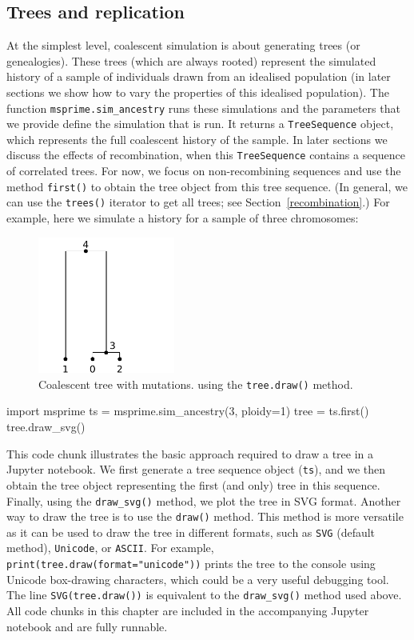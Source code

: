 \documentclass[graybox]{svmult}
\begin{document}
\subsection{Trees and replication}
At the simplest level, coalescent simulation is about generating trees (or genealogies).
These trees (which are always rooted) represent the simulated history of a sample of individuals
drawn from an idealised population (in later sections we show how to
vary the properties of this idealised population). The function
\texttt{msprime.sim\_ancestry} runs these simulations and the parameters
that we provide define the simulation that is
run. It returns a \texttt{TreeSequence} object, which represents the
full coalescent history of the sample. In later sections we discuss the
effects of recombination, when this \texttt{TreeSequence} contains a
sequence of correlated trees. For now, we focus on non-recombining sequences and
use the method \texttt{first()} to obtain the
tree object from this tree sequence. (In general, we can use the \texttt{trees()} iterator
to get all trees; see Section~\ref{recombination}.) For example, here we simulate a
history for a sample of three chromosomes:

\begin{figure}[t]
\begin{center}
\includegraphics[width=0.4\textwidth]{images/plot_1.pdf}
\end{center}
\caption{\label{fig-simple-tree} Coalescent tree with mutations.
using the \texttt{tree.draw()} method.}
\end{figure}

\begin{pythoncode}
import msprime
ts = msprime.sim_ancestry(3, ploidy=1)
tree = ts.first()
tree.draw_svg()
\end{pythoncode}

This code chunk illustrates the basic approach required to draw a tree
in a Jupyter notebook. We first generate a tree sequence object (\texttt{ts}),
and we then obtain the tree object representing the first (and only)
tree in this sequence. Finally, using the \texttt{draw\_svg()} method, we plot
the tree in SVG format. Another way to draw the tree is to use the
\texttt{draw()} method. This method is more versatile as it can be used to
draw the tree in different formats, such as \texttt{SVG} (default method),
\texttt{Unicode}, or \texttt{ASCII}. For example,
\texttt{print(tree.draw(format="unicode"))} prints the tree to the console
using Unicode box-drawing characters, which could be a very useful debugging tool.
The line \texttt{SVG(tree.draw())} is equivalent to the \texttt{draw\_svg()} method
used above. All code chunks in this chapter are included in the accompanying Jupyter
notebook and are fully runnable.
\end{document}
